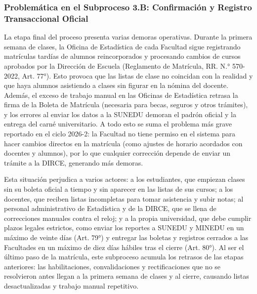 \subsubsection{Problemática en el Subproceso 3.B: Confirmación y Registro Transaccional Oficial}
La etapa final del proceso presenta varias demoras operativas. Durante la primera semana de clases, la Oficina de Estadística de cada Facultad sigue registrando matrículas tardías de alumnos reincorporados y procesando cambios de cursos aprobados por la Dirección de Escuela (Reglamento de Matrícula, RR. N.° 570-2022, Art. 77°). Esto provoca que las listas de clase no coincidan con la realidad y que haya alumnos asistiendo a clases sin figurar en la nómina del docente. Además, el exceso de trabajo manual en las Oficinas de Estadística retrasa la firma de la Boleta de Matrícula (necesaria para becas, seguros y otros trámites), y los errores al enviar los datos a la SUNEDU demoran el padrón oficial y la entrega del carné universitario. A todo esto se suma el problema más grave reportado en el ciclo 2026-2: la Facultad no tiene permiso en el sistema para hacer cambios directos en la matrícula (como ajustes de horario acordados con docentes y alumnos), por lo que cualquier corrección depende de enviar un trámite a la DIRCE, generando más demoras.

Esta situación perjudica a varios actores: a los estudiantes, que empiezan clases sin su boleta oficial a tiempo y sin aparecer en las listas de sus cursos; a los docentes, que reciben listas incompletas para tomar asistencia y subir notas; al personal administrativo de Estadística y de la DIRCE, que se llena de correcciones manuales contra el reloj; y a la propia universidad, que debe cumplir plazos legales estrictos, como enviar los reportes a SUNEDU y MINEDU en un máximo de veinte días (Art. 79°) y entregar las boletas y registros cerrados a las Facultades en un máximo de diez días hábiles tras el cierre (Art. 80°). Al ser el último paso de la matrícula, este subproceso acumula los retrasos de las etapas anteriores: las habilitaciones, convalidaciones y rectificaciones que no se resolvieron antes llegan a la primera semana de clases y al cierre, causando listas desactualizadas y trabajo manual repetitivo.

